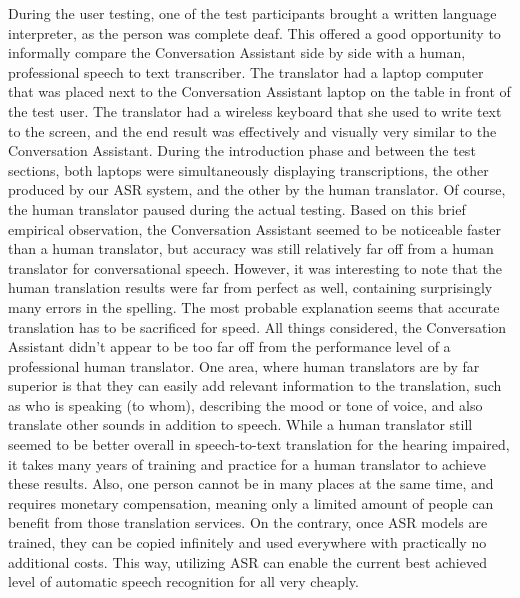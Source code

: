 \documentclass[english, 12pt, a4paper, pdftex, elec, utf8]{aaltothesis}
\begin{document}
During the user testing, one of the test participants brought a written language interpreter, as the person was complete deaf. This offered a good opportunity to informally compare the Conversation Assistant side by side with a human, professional speech to text transcriber. The translator had a laptop computer that was placed next to the Conversation Assistant laptop on the table in front of the test user. The translator had a wireless keyboard that she used to write text to the screen, and the end result was effectively and visually very similar to the Conversation Assistant. During the introduction phase and between the test sections, both laptops were simultaneously displaying transcriptions, the other produced by our ASR system, and the other by the human translator. Of course, the human translator paused during the actual testing. Based on this brief empirical observation, the Conversation Assistant seemed to be noticeable faster than a human translator, but accuracy was still relatively far off from a human translator for conversational speech. However, it was interesting to note that the human translation results were far from perfect as well, containing surprisingly many errors in the spelling. The most probable explanation seems that accurate translation has to be sacrificed for speed. All things considered, the Conversation Assistant didn't appear to be too far off from the performance level of a professional human translator. One area, where human translators are by far superior is that they can easily add relevant information to the translation, such as who is speaking (to whom), describing the mood or tone of voice, and also translate other sounds in addition to speech. While a human translator still seemed to be better overall in speech-to-text translation for the hearing impaired, it takes many years of training and practice for a human translator to achieve these results. Also, one person cannot be in many places at the same time, and requires monetary compensation, meaning only a limited amount of people can benefit from those translation services. On the contrary, once ASR models are trained, they can be copied infinitely and used everywhere with practically no additional costs. This way, utilizing ASR can enable the current best achieved level of automatic speech recognition for all very cheaply. \\\\
\end{document}
